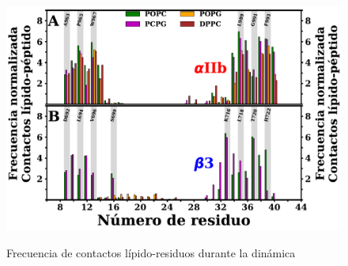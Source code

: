 \begin{figure}[H]
    \centering
	\includegraphics[width=1\linewidth, height=0.99\textheight, keepaspectratio]{fig/02_dm/lipid_pept_contac_all.pdf} 
	\caption[Frecuencia de contactos lípido-residuos durante la dinámica.]{Frecuencia de contactos lípido-residuos durante la dinámica}
    \label{fig:lipid_resID_contac}
\end{figure}
